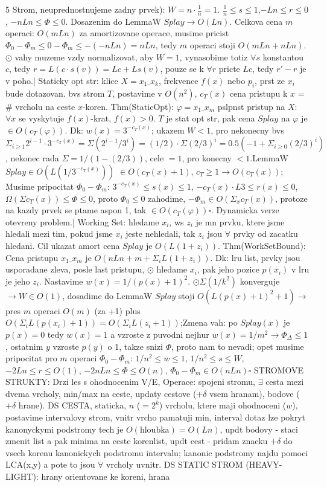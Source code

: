 \documentclass[8pt]{extarticle}
\begin{document}
\begin{multicols*}{5}
Strom, neuprednostnujeme zadny prvek): $W=n\cdot\frac{1}{n}=1$. $\frac{1}{n}\leq s\leq1$,$-Ln\leq r\leq0$, $-nLn\leq\Phi\leq0$. Dosazenim do LemmaW $Splay\rightarrow O(Ln)$. Celkova cena $m$ operaci: $O(mLn)$ za amortizovane operace, musime pricist $\Phi_0-\Phi_m \leq 0-\Phi_m\leq-(-nLn)=nLn$, tedy $m$ operaci stoji $O(mLn + nLn)$. $\odot$ vahy muzeme vzdy normalizovat, aby $W=1$, vynasobime totiz $\forall s$ konstantou $c$, tedy $r = L(c\cdot s(v)) =Lc + Ls(v)$, pouze se k $\forall r$ pricte $Lc$, tedy $r'-r$ je v poho.| Staticky opt str: klice $X={x_1\_x_k}$, frekvence $f(x)$ nebo $p_i$, prst ze $x_i$ bude dotazovan. bvs strom $T$, postavime v $O(n^2)$, $c_T(x)$ cena pristupu k $x$ = \# vrcholu na ceste $x$-koren. Thm(StaticOpt): $\varphi=x_1\_x_m$ pslpnst pristup na $X$: $\forall x$ se vyskytuje $f(x)$-krat, $f(x)>0$. $T$ je stat opt str, pak cena $Splay$ na $\varphi$ je $\in O(c_T(\varphi))$. Dk: $w(x) = 3^{-c_T(x)}$; ukazem $W<1$, pro nekonecny bvs $\Sigma_{i\geq1} 2^{i-1}\cdot3^{-c_T(x)}=\Sigma(2^{i-1}/3^i) = (1/2)\cdot\Sigma(2/3)^i = 0.5(-1+\Sigma_{i\geq0}(2/3)^i)$, nekonec rada $\Sigma = 1/(1-(2/3))$, cele $=1$, pro konecny $<1$.LemmaW $Splay \in O(L(1/3^{-c_T(x)}))$ $\in O(c_T(x)+1)$, $c_T\geq1\rightarrow O(c_T(x))$; Musime pripocitat $\Phi_0-\Phi_m$: $3^{-c_T(x)}\leq s(x)\leq 1$, $-c_T(x)\cdot L3\leq r(x)\leq0$, $\Omega(\Sigma c_T(x)) \leq \Phi \leq 0$, proto $\Phi_0 \leq 0$ zahodime, $-\Phi_m \in O(\Sigma_{x} c_T(x))$, protoze na kazdy prvek se ptame aspon 1, tak $\in O(c_T(\varphi)) \square$. Dynamicka verze otevreny problem.| Working Set: hledame $x_i$, ws $z_i$ je mn prvku, ktere jsme hledali mezi tim, pokud jsme $x_i$ jeste nehledali, tak $z_i$ jsou $\forall$ prvky od zacatku hledani. Cil ukazat amort cena $Splay$ je $O(L(1+z_i))$. Thm(WorkSetBound): Cena pristupu $x_1\_x_m$ je $O(nLn+m+\Sigma_i L(1+z_i))$. Dk: lru list, prvky jsou usporadane zleva, posle last pristupu, $\odot$ hledame $x_i$, pak jeho pozice $p(x_i)$ v lru je jeho $z_i$. Nastavime $w(x)=1/(p(x)+1)^2$. $\odot \Sigma(1/k^2)$ konverguje $\rightarrow W \in O(1)$, dosadime do LemmaW $Splay$ stoji $O(L(p(x)+1)^2+1) \rightarrow$ pres $m$ operaci $O(m)$ (za +1) plus $O(\Sigma_i L(p(x_i)+1)) = O(\Sigma_i L(z_i+1))$;Zmena vah: po $Splay(x)$ je $p(x)=0$ tedy $w(x)=1$ a vzroste z puvodni nejhur $w(x)=1/m^2 \rightarrow \Phi_\Delta \leq 1$, ostatnim $y$ vzroste $p(y)$ o 1, takze snizi $\Phi$, proto nam to nevadi; opet musime pripocitat pro $m$ operaci $\Phi_0 -\Phi_m$: $1/n^2 \leq w \leq 1$, $1/n^2 \leq s\leq W$, $-2Ln\leq r\leq O(1)$, $-2nLn \leq \Phi \leq O(n)$, $\Phi_0 - \Phi_m \in O(nLn) \square$ STROMOVE STRUKTY: Drzi les s ohodnocenim V/E, Operace: spojeni stromu, $\exists$ cesta mezi dvema vrcholy, min/max na ceste, updaty cestove ($+\delta$ vsem hranam), bodove ($+\delta$ hrane). DS CESTA, staticka, $n$ ($=2^k$) vrcholu, ktere maji ohodnoceni ($w$), postavime intervalovy strom, vnitr vrcho pamatuji min, interval dotaz lze pokryt kanonyckymi podstromy tech je $O(\text{hloubka})=O(Ln)$, updt bodovy - staci zmenit list a pak minima na ceste korenlist, updt cest - pridam znacku $+\delta$ do vsech korenu kanonickych podstromu intervalu; kanonic podstromy najdu pomoci LCA(x,y) a pote to jsou $\forall$ vrcholy uvnitr.  DS STATIC STROM (HEAVY-LIGHT): hrany orientovane ke koreni, hrana 
\end{multicols*}
\end{document}

